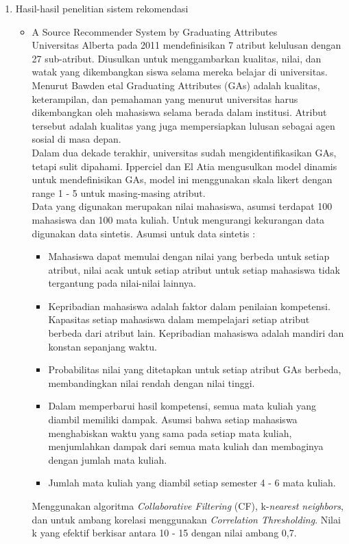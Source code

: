 \documentclass[a4paper,twoside]{article}
\begin{document}
\begin{enumerate}
\begin{enumerate}
			\item Hasil-hasil penelitian sistem rekomendasi 
			\begin{itemize}
			\item A Source Recommender System by Graduating Attributes \\
				Universitas Alberta pada 2011 mendefinisikan 7 atribut kelulusan dengan 27 sub-atribut. Diusulkan untuk menggambarkan kualitas, nilai, dan watak yang dikembangkan siswa selama mereka belajar di universitas.    \\
				Menurut Bawden etal Graduating Attributes (GAs) adalah kualitas, keterampilan, dan pemahaman yang menurut universitas harus dikembangkan oleh mahasiswa selama berada dalam institusi.  Atribut tersebut adalah kualitas yang juga mempersiapkan lulusan sebagai agen sosial di masa depan.\\
				Dalam dua dekade terakhir, universitas sudah mengidentifikasikan GAs, tetapi sulit dipahami. Ipperciel dan El Atia mengusulkan model dinamis untuk mendefinisikan GAs, model ini menggunakan skala likert dengan range 1 - 5 untuk masing-masing atribut.\\
				Data yang digunakan merupakan nilai mahasiswa, asumsi terdapat 100 mahasiswa dan 100 mata kuliah. Untuk mengurangi kekurangan data digunakan data sintetis. Asumsi untuk data sintetis :
				\begin{itemize}
				\item Mahasiswa dapat memulai dengan nilai yang berbeda untuk setiap atribut, nilai acak untuk setiap atribut untuk setiap mahasiswa tidak tergantung pada nilai-nilai lainnya.
				\item Kepribadian mahasiswa adalah faktor dalam penilaian kompetensi. Kapasitas setiap mahasiswa dalam mempelajari setiap atribut berbeda dari atribut lain. Kepribadian mahasiswa adalah mandiri dan konstan sepanjang waktu.
				\item Probabilitas nilai yang ditetapkan untuk setiap atribut GAs berbeda, membandingkan nilai rendah dengan nilai tinggi.
				\item Dalam memperbarui hasil kompetensi, semua mata kuliah yang diambil memiliki dampak. Asumsi bahwa setiap mahasiswa menghabiskan waktu yang sama pada setiap mata kuliah, menjumlahkan dampak dari semua mata kuliah dan membaginya dengan jumlah mata kuliah. 
				\item Jumlah mata kuliah yang diambil setiap semester 4 - 6 mata kuliah.  
				\end{itemize}
				Menggunakan algoritma \textit{Collaborative Filtering} (CF), k-\textit{nearest neighbors}, dan untuk ambang korelasi menggunakan \textit{Correlation Thresholding}. Nilai k yang efektif berkisar antara 10 - 15 dengan nilai ambang 0,7. 
			

\end{itemize}
\end{enumerate}
\end{enumerate}
\end{document}
